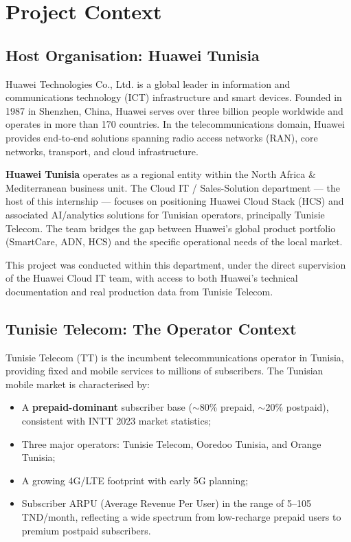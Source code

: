 \chapter{Project Context}
\label{ch:context}

\section{Host Organisation: Huawei Tunisia}

Huawei Technologies Co., Ltd. is a global leader in information and communications technology (ICT) infrastructure and smart devices. Founded in 1987 in Shenzhen, China, Huawei serves over three billion people worldwide and operates in more than 170 countries. In the telecommunications domain, Huawei provides end-to-end solutions spanning radio access networks (RAN), core networks, transport, and cloud infrastructure.

\textbf{Huawei Tunisia} operates as a regional entity within the North Africa \& Mediterranean business unit. The Cloud IT / Sales-Solution department --- the host of this internship --- focuses on positioning Huawei Cloud Stack (HCS) and associated AI/analytics solutions for Tunisian operators, principally Tunisie Telecom. The team bridges the gap between Huawei's global product portfolio (SmartCare, ADN, HCS) and the specific operational needs of the local market.

This project was conducted within this department, under the direct supervision of the Huawei Cloud IT team, with access to both Huawei's technical documentation and real production data from Tunisie Telecom.

\section{Tunisie Telecom: The Operator Context}

Tunisie Telecom (TT) is the incumbent telecommunications operator in Tunisia, providing fixed and mobile services to millions of subscribers. The Tunisian mobile market is characterised by:

\begin{itemize}
  \item A \textbf{prepaid-dominant} subscriber base ($\sim$80\% prepaid, $\sim$20\% postpaid), consistent with INTT 2023 market statistics;
  \item Three major operators: Tunisie Telecom, Ooredoo Tunisia, and Orange Tunisia;
  \item A growing 4G/LTE footprint with early 5G planning;
  \item Subscriber ARPU (Average Revenue Per User) in the range of 5--105 TND/month, reflecting a wide spectrum from low-recharge prepaid users to premium postpaid subscribers.
\end{itemize}

